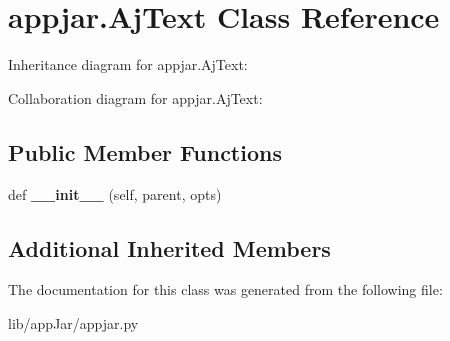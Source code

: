 \hypertarget{classappjar_1_1_aj_text}{}\section{appjar.\+Aj\+Text Class Reference}
\label{classappjar_1_1_aj_text}


Inheritance diagram for appjar.\+Aj\+Text\+:


Collaboration diagram for appjar.\+Aj\+Text\+:
\subsection*{Public Member Functions}
\begin{DoxyCompactItemize}
\item 
\mbox{\label{classappjar_1_1_aj_text_ad5e3dd7beece76de98eb3af23597f383}} 
def {\bfseries \+\_\+\+\_\+init\+\_\+\+\_\+} (self, parent, opts)
\end{DoxyCompactItemize}
\subsection*{Additional Inherited Members}


The documentation for this class was generated from the following file\+:\begin{DoxyCompactItemize}
\item 
lib/app\+Jar/appjar.\+py\end{DoxyCompactItemize}
